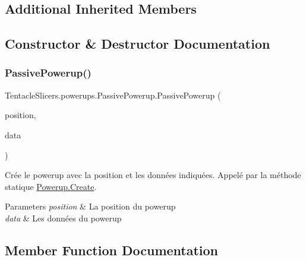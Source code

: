\subsection*{Additional Inherited Members}


\subsection{Constructor \& Destructor Documentation}
\mbox{\label{class_tentacle_slicers_1_1powerups_1_1_passive_powerup_abf4b681f1941b297fb4a4d5d943b5a71}} 
\subsubsection{\texorpdfstring{Passive\+Powerup()}{PassivePowerup()}}
{\footnotesize\ttfamily Tentacle\+Slicers.\+powerups.\+Passive\+Powerup.\+Passive\+Powerup (\begin{DoxyParamCaption}\item[{\hyperlink{class_tentacle_slicers_1_1general_1_1_point}{Point}}]{position,  }\item[{\hyperlink{class_tentacle_slicers_1_1powerups_1_1_powerup_data}{Powerup\+Data}}]{data }\end{DoxyParamCaption})}



Crée le powerup avec la position et les données indiquées. Appelé par la méthode statique \hyperlink{class_tentacle_slicers_1_1powerups_1_1_powerup_a9aecde45bf218c2241b7454235e68050}{Powerup.\+Create}. 


\begin{DoxyParams}{Parameters}
{\em position} & La position du powerup \\
\hline
{\em data} & Les données du powerup \\
\hline
\end{DoxyParams}


\subsection{Member Function Documentation}
\mbox{\label{class_tentacle_slicers_1_1powerups_1_1_passive_powerup_a362a58a946f2d33b4aeef20ce605c8f9}} 
